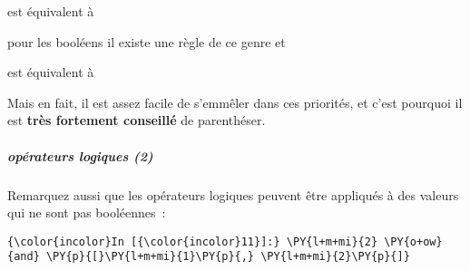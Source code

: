 \begin{Shaded}
\begin{Highlighting}[frame=lines,framerule=0.6mm,rulecolor=\color{asisframecolor}]
 \OperatorTok{+}  \OperatorTok{*} 
\end{Highlighting}
\end{Shaded}

est équivalent à

\begin{Shaded}
\begin{Highlighting}[frame=lines,framerule=0.6mm,rulecolor=\color{asisframecolor}]
 \OperatorTok{+}\NormalTok{ ( } \OperatorTok{*} \NormalTok{ )}
\end{Highlighting}
\end{Shaded}

pour les booléens il existe une règle de ce genre et

\begin{Shaded}
\begin{Highlighting}[frame=lines,framerule=0.6mm,rulecolor=\color{asisframecolor}]
 
\end{Highlighting}
\end{Shaded}

est équivalent à

\begin{Shaded}
\begin{Highlighting}[frame=lines,framerule=0.6mm,rulecolor=\color{asisframecolor}]
\NormalTok{ (}
\end{Highlighting}
\end{Shaded}

Mais en fait, il est assez facile de s'emmêler dans ces priorités, et
c'est pourquoi il est \textbf{très fortement conseillé} de parenthéser.

    \hypertarget{opuxe9rateurs-logiques-2}{%
\subparagraph{opérateurs logiques (2)}\label{opuxe9rateurs-logiques-2}}

    Remarquez aussi que les opérateurs logiques peuvent être appliqués à des
valeurs qui ne sont pas booléennes~:

    \begin{Verbatim}[commandchars=\\\{\},frame=single,framerule=0.3mm,rulecolor=\color{cellframecolor}]
{\color{incolor}In [{\color{incolor}11}]:} \PY{l+m+mi}{2} \PY{o+ow}{and} \PY{p}{[}\PY{l+m+mi}{1}\PY{p}{,} \PY{l+m+mi}{2}\PY{p}{]}
\end{Verbatim}


